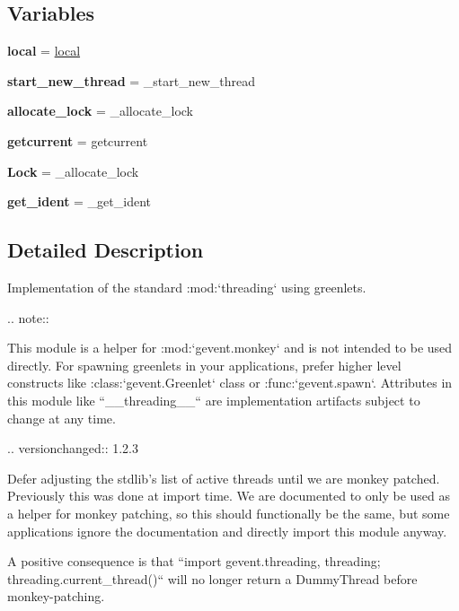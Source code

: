 \subsection*{Variables}
\begin{DoxyCompactItemize}
\item 
\mbox{\label{namespacegevent_1_1threading_a37b6cb439b32d545f200468c481a3d59}} 
{\bfseries local} = \hyperlink{classgevent_1_1local_1_1local}{local}
\item 
\mbox{\label{namespacegevent_1_1threading_abc69c90c9a034604f27af92a615c2eb9}} 
{\bfseries start\+\_\+new\+\_\+thread} = \+\_\+start\+\_\+new\+\_\+thread
\item 
\mbox{\label{namespacegevent_1_1threading_a107289ec24977973e7ab9e4ac6806996}} 
{\bfseries allocate\+\_\+lock} = \+\_\+allocate\+\_\+lock
\item 
\mbox{\label{namespacegevent_1_1threading_adcf424a928bfb1653b4f46b4a9b38f52}} 
{\bfseries getcurrent} = getcurrent
\item 
\mbox{\label{namespacegevent_1_1threading_a2f28fe3a5bf76269b0f04fd2f1786cc3}} 
{\bfseries Lock} = \+\_\+allocate\+\_\+lock
\item 
\mbox{\label{namespacegevent_1_1threading_ade2298b925085690c712eb1343a4e9f9}} 
{\bfseries get\+\_\+ident} = \+\_\+get\+\_\+ident
\end{DoxyCompactItemize}


\subsection{Detailed Description}
\begin{DoxyVerb}Implementation of the standard :mod:`threading` using greenlets.

.. note::

    This module is a helper for :mod:`gevent.monkey` and is not
    intended to be used directly. For spawning greenlets in your
    applications, prefer higher level constructs like
    :class:`gevent.Greenlet` class or :func:`gevent.spawn`. Attributes
    in this module like ``__threading__`` are implementation artifacts subject
    to change at any time.

.. versionchanged:: 1.2.3

   Defer adjusting the stdlib's list of active threads until we are
   monkey patched. Previously this was done at import time. We are
   documented to only be used as a helper for monkey patching, so this should
   functionally be the same, but some applications ignore the documentation and
   directly import this module anyway.

   A positive consequence is that ``import gevent.threading,
   threading; threading.current_thread()`` will no longer return a DummyThread
   before monkey-patching.
\end{DoxyVerb}
 